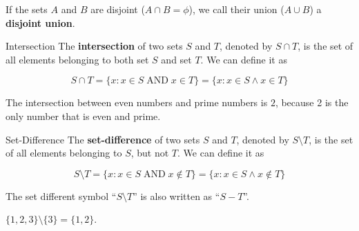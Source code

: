 If the sets $A$ and $B$ are disjoint ($A \cap B = \phi$), we call their union ($A \cup B$) a {\bf disjoint union}.

\begin{boxdefine}{Intersection}{}
	The {\bf intersection} of two sets $S$ and $T$, denoted by $S\cap T$, is the set of all elements belonging to both set $S$ and set $T$. We can define it as

	\[
		S \cap T = \{ x : x \in S \;\text{AND}\; x \in T\} = \{ x : x \in S \land x \in T\}
	\]
\end{boxdefine}

\begin{boxexample}{}{}
	The intersection between even numbers and prime numbers is ${2}$, because 2 is the only number that is even and prime.
\end{boxexample}

\begin{boxdefine}{Set-Difference}{}
	The {\bf set-difference} of two sets $S$ and $T$, denoted by $S \setminus T$, is the set of all elements belonging to $S$, but not $T$. We can define it as

	\[
		S \setminus T = \{x : x \in S \;\text{AND}\; x \notin T\} = \{x : x \in S \land x \notin T\}
	\]
\end{boxdefine}

\begin{boxnotation*}{}{}
	The set different symbol ``$S \setminus T$'' is also written as ``$S-T$''.
\end{boxnotation*}

\begin{boxexample}{}{}
	$\{1,2,3\} \setminus \{3\} = \{1,2\}$.
\end{boxexample}
